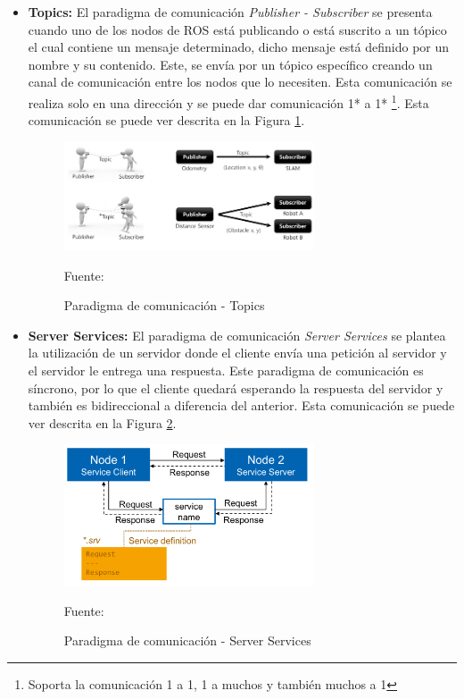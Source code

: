\begin{itemize}
    \item \textbf{Topics: } El paradigma de comunicación \textit{Publisher - Subscriber} se presenta cuando uno de los nodos de ROS está publicando o está suscrito a un tópico el cual contiene un mensaje determinado, dicho mensaje está definido por un nombre y su contenido. Este, se envía por un tópico específico creando un canal de comunicación entre los nodos que lo necesiten. Esta comunicación se realiza solo en una dirección y se puede dar comunicación 1* a 1* \footnote{Soporta la comunicación 1 a 1, 1 a muchos y también muchos a 1}. Esta comunicación se puede ver descrita en la Figura \ref{fig:ROS_topics}.
    \begin{figure}[h]
    \centering
    \includegraphics[width=0.7\textwidth]{figures/02marco_conceptual/ROS_topic.png}
    \caption{\label{fig:ROS_topics} Paradigma de comunicación - Topics} 
    Fuente: \cite{robin_robotics_2019}
    \end{figure}
    
    \item \textbf{Server Services: }
    El paradigma de comunicación \textit{Server Services} se plantea la utilización de un servidor donde el cliente envía una petición al servidor y el servidor le entrega una respuesta. Este paradigma de comunicación es síncrono, por lo que el cliente quedará esperando la respuesta del servidor y también es bidireccional a diferencia del anterior. Esta comunicación se puede ver descrita en la Figura \ref{fig:ROS_services}.
    
    \begin{figure}[h]
    \centering
    \includegraphics[width=0.7\textwidth]{figures/02marco_conceptual/ROS_service.png}
    \caption{\label{fig:ROS_services} Paradigma de comunicación - Server Services} 
    Fuente: \cite{ros_services_2018}
    \end{figure}
    

\end{itemize}
